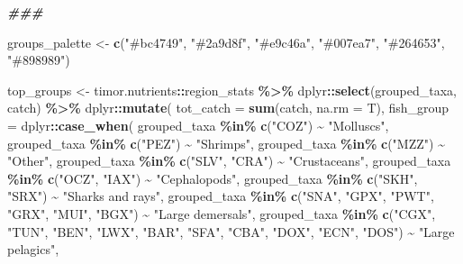 \documentclass[
]{book}
\newenvironment{Shaded}{\begin{snugshade}}{\end{snugshade}}
\newcommand{\AttributeTok}[1]{\textcolor[rgb]{0.13,0.29,0.53}{#1}}
\newcommand{\DocumentationTok}[1]{\textcolor[rgb]{0.56,0.35,0.01}{\textbf{\textit{#1}}}}
\newcommand{\FunctionTok}[1]{\textcolor[rgb]{0.13,0.29,0.53}{\textbf{#1}}}
\newcommand{\NormalTok}[1]{#1}
\newcommand{\OtherTok}[1]{\textcolor[rgb]{0.56,0.35,0.01}{#1}}
\newcommand{\SpecialCharTok}[1]{\textcolor[rgb]{0.81,0.36,0.00}{\textbf{#1}}}
\newcommand{\StringTok}[1]{\textcolor[rgb]{0.31,0.60,0.02}{#1}}
\begin{document}
\begin{Shaded}
\begin{Highlighting}[]
\DocumentationTok{\#\#\#}

\NormalTok{groups\_palette }\OtherTok{\textless{}{-}} \FunctionTok{c}\NormalTok{(}\StringTok{"\#bc4749"}\NormalTok{, }\StringTok{"\#2a9d8f"}\NormalTok{, }\StringTok{"\#e9c46a"}\NormalTok{, }\StringTok{"\#007ea7"}\NormalTok{, }\StringTok{"\#264653"}\NormalTok{, }\StringTok{"\#898989"}\NormalTok{)}

\NormalTok{top\_groups }\OtherTok{\textless{}{-}}
\NormalTok{  timor.nutrients}\SpecialCharTok{::}\NormalTok{region\_stats }\SpecialCharTok{\%\textgreater{}\%}
\NormalTok{  dplyr}\SpecialCharTok{::}\FunctionTok{select}\NormalTok{(grouped\_taxa, catch) }\SpecialCharTok{\%\textgreater{}\%}
\NormalTok{  dplyr}\SpecialCharTok{::}\FunctionTok{mutate}\NormalTok{(}
    \AttributeTok{tot\_catch =} \FunctionTok{sum}\NormalTok{(catch, }\AttributeTok{na.rm =}\NormalTok{ T),}
    \AttributeTok{fish\_group =}\NormalTok{ dplyr}\SpecialCharTok{::}\FunctionTok{case\_when}\NormalTok{(}
\NormalTok{      grouped\_taxa }\SpecialCharTok{\%in\%} \FunctionTok{c}\NormalTok{(}\StringTok{"COZ"}\NormalTok{) }\SpecialCharTok{\textasciitilde{}} \StringTok{"Molluscs"}\NormalTok{,}
\NormalTok{      grouped\_taxa }\SpecialCharTok{\%in\%} \FunctionTok{c}\NormalTok{(}\StringTok{"PEZ"}\NormalTok{) }\SpecialCharTok{\textasciitilde{}} \StringTok{"Shrimps"}\NormalTok{,}
\NormalTok{      grouped\_taxa }\SpecialCharTok{\%in\%} \FunctionTok{c}\NormalTok{(}\StringTok{"MZZ"}\NormalTok{) }\SpecialCharTok{\textasciitilde{}} \StringTok{"Other"}\NormalTok{,}
\NormalTok{      grouped\_taxa }\SpecialCharTok{\%in\%} \FunctionTok{c}\NormalTok{(}\StringTok{"SLV"}\NormalTok{, }\StringTok{"CRA"}\NormalTok{) }\SpecialCharTok{\textasciitilde{}} \StringTok{"Crustaceans"}\NormalTok{,}
\NormalTok{      grouped\_taxa }\SpecialCharTok{\%in\%} \FunctionTok{c}\NormalTok{(}\StringTok{"OCZ"}\NormalTok{, }\StringTok{"IAX"}\NormalTok{) }\SpecialCharTok{\textasciitilde{}} \StringTok{"Cephalopods"}\NormalTok{,}
\NormalTok{      grouped\_taxa }\SpecialCharTok{\%in\%} \FunctionTok{c}\NormalTok{(}\StringTok{"SKH"}\NormalTok{, }\StringTok{"SRX"}\NormalTok{) }\SpecialCharTok{\textasciitilde{}} \StringTok{"Sharks and rays"}\NormalTok{,}
\NormalTok{      grouped\_taxa }\SpecialCharTok{\%in\%} \FunctionTok{c}\NormalTok{(}\StringTok{"SNA"}\NormalTok{, }\StringTok{"GPX"}\NormalTok{, }\StringTok{"PWT"}\NormalTok{, }\StringTok{"GRX"}\NormalTok{, }\StringTok{"MUI"}\NormalTok{, }\StringTok{"BGX"}\NormalTok{) }\SpecialCharTok{\textasciitilde{}} \StringTok{"Large demersals"}\NormalTok{,}
\NormalTok{      grouped\_taxa }\SpecialCharTok{\%in\%} \FunctionTok{c}\NormalTok{(}\StringTok{"CGX"}\NormalTok{, }\StringTok{"TUN"}\NormalTok{, }\StringTok{"BEN"}\NormalTok{, }\StringTok{"LWX"}\NormalTok{, }\StringTok{"BAR"}\NormalTok{, }\StringTok{"SFA"}\NormalTok{, }\StringTok{"CBA"}\NormalTok{, }\StringTok{"DOX"}\NormalTok{, }\StringTok{"ECN"}\NormalTok{, }\StringTok{"DOS"}\NormalTok{) }\SpecialCharTok{\textasciitilde{}} \StringTok{"Large pelagics"}\NormalTok{,}

\end{Highlighting}
\end{Shaded}
\end{document}

